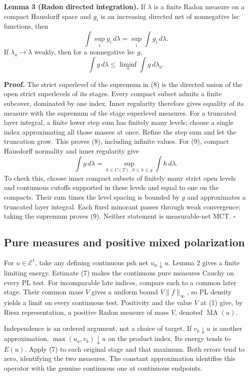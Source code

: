 \documentclass[
]{article}
\begin{document}
\textbf{Lemma 3 (Radon directed integration).} If \(\lambda\) is a
finite Radon measure on a compact Hausdorff space and \(g_i\) is an
increasing directed net of nonnegative lsc functions, then \[
\int\sup_i g_i\,d\lambda=\sup_i\int g_i\,d\lambda.
\tag{8}
\] If \(\lambda_a\to\lambda\) weakly, then for a nonnegative lsc \(g\),
\[
\int g\,d\lambda\leq\liminf_a\int g\,d\lambda_a.
\tag{9}
\]

\textbf{Proof.} The strict superlevel of the supremum in (8) is the
directed union of the open strict superlevels of its stages. Every
compact subset admits a finite subcover, dominated by one index. Inner
regularity therefore gives equality of its measure with the supremum of
the stage superlevel measures. For a truncated layer integral, a finite
lower step sum has finitely many levels; choose a single index
approximating all those masses at once. Refine the step sum and let the
truncation grow. This proves (8), including infinite values. For (9),
compact Hausdorff normality and inner regularity give \[
\int g\,d\lambda=\sup_{h\in C(T),\ 0\leq h\leq g}\int h\,d\lambda.
\] To check this, choose inner compact subsets of finitely many strict
open levels and continuous cutoffs supported in these levels and equal
to one on the compacts. Their sum times the level spacing is bounded by
\(g\) and approximates a truncated layer integral. Each fixed minorant
passes through weak convergence; taking the supremum proves (9). Neither
statement is measurable-net MCT. \(\square\)

\subsection{Pure measures and positive mixed
polarization}\label{pure-measures-and-positive-mixed-polarization}

For \(u\in\mathcal E^1\), take any defining continuous psh net
\(u_a\downarrow u\). Lemma 2 gives a finite limiting energy. Estimate
(7) makes the continuous pure measures Cauchy on every PL test. For
incomparable late indices, compare each to a common later stage. Their
common mass \(V\) gives a uniform bound \(V\|f\|_\infty\), so PL density
yields a limit on every continuous test. Positivity and the value \(V\)
at (1) give, by Riesz representation, a positive Radon measure of mass
\(V\), denoted \(\operatorname{MA}(u)\).

Independence is an ordered argument, not a choice of target. If
\(v_b\downarrow u\) is another approximation,
\(\max(u_a,v_b)\downarrow u\) on the product index. Its energy tends to
\(E(u)\). Apply (7) to each original stage and that maximum. Both errors
tend to zero, identifying the two measures. The constant approximation
identifies this operator with the genuine continuous one at continuous
endpoints.
\end{document}
